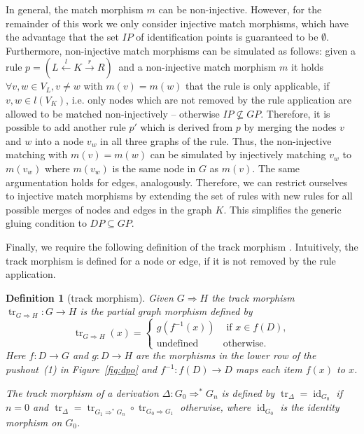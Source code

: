 \documentclass{tlp}
\newtheorem{definition}{Definition}[section]
\newcommand{\dergts}{\ensuremath{\Rightarrow}}
\DeclareMathOperator{\track}{tr}
\DeclareMathOperator{\id}{id}
\newcommand{\prodrule}{\ensuremath{p = (L \stackrel{l}{\leftarrow} K
\stackrel{r}{\rightarrow} R)\ }}
\begin{document}
In general, the match morphism $m$ can be non-injective. However, for the
remainder of this work we only consider injective match morphisms, which have the
advantage that the set $IP$ of identification points is guaranteed to be
$\emptyset$. Furthermore, non-injective match morphisms can be simulated as
follows: given a rule $\prodrule$ and a non-injective match morphism $m$ it holds
$\forall v,w \in V_L, v \ne w$ with $m(v) = m(w)$ that the rule is only
applicable, if $v,w \in l(V_K)$, i.e. only nodes which are not removed by the
rule application are allowed to be matched non-injectively -- otherwise $IP \not
\subseteq GP$. Therefore, it is possible to add another rule $p'$ which is
derived from $p$ by merging the nodes $v$ and $w$ into a node $v_w$ in all three
graphs of the rule. Thus, the non-injective matching with $m(v) = m(w)$ can be
simulated by injectively matching $v_w$ to $m(v_w)$ where $m(v_w)$ is the same
node in $G$ as $m(v)$. The same argumentation holds for edges, analogously.
Therefore, we can restrict ourselves to injective match morphisms by extending
the set of rules with new rules for all possible merges of nodes and edges in the
graph $K$. This simplifies the generic gluing condition to $DP \subseteq GP$.

Finally, we require the following definition of the track morphism
\cite{Plump1995}. Intuitively, the track morphism is defined for a node or edge,
if it is not removed by the rule application.

\begin{definition}[track morphism]\label{def:track} Given $G \dergts H$
the \emph{track morphism} $\track_{G \dergts H}: G \rightarrow H$ is the partial
graph morphism defined by $$ \track_{G \dergts H}(x) = \left\{
 \begin{matrix}
 g(f^{-1}(x)) & \text{ if } x \in f(D),\\
 \text{undefined} & \text{otherwise.}
 \end{matrix} \right.
$$
Here $f: D \rightarrow G$ and $g : D \rightarrow H$ are the morphisms in the
lower row of the pushout~(1) in Figure~\ref{fig:dpo} and $f^{-1} : f(D)
\rightarrow D$ maps each item $f(x)$ to $x$.

The track morphism of a derivation $\Delta : G_0 \dergts^* G_n$ is defined by
$\track_{\Delta} = \id_{G_0}$ if $n = 0$ and $\track_{\Delta} = \track_{G_1
\dergts^* G_n} \circ \track_{G_0 \dergts G_1}$ otherwise, where
$\id_{G_0}$ is the identity morphism on $G_0$.
\end{definition}
\end{document}
